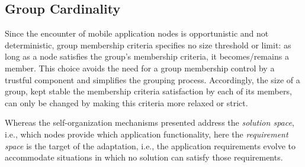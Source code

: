\subsection{Group Cardinality} 

Since the encounter of mobile application nodes is opportunistic and not deterministic, group membership criteria specifies no size threshold or limit: as long as a node satisfies the group's membership criteria, it becomes/remains a member. This choice avoids the need for a group membership control by a trustful component and simplifies the grouping process. Accordingly, the size of a group, kept stable the membership criteria satisfaction by each of its members, can only be changed by making this criteria more relaxed or strict. 

Whereas the self-organization mechanisms presented address the \textit{solution space}, i.e., which nodes provide which application functionality, here the \textit{requirement space} is the target of the adaptation, i.e., the application requirements evolve to accommodate situations in which no solution can satisfy those requirements.
